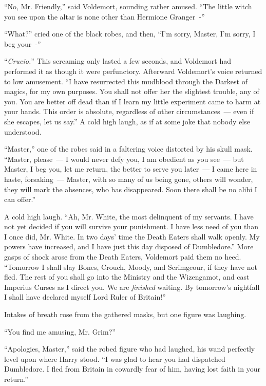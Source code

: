``No, Mr. Friendly,'' said Voldemort, sounding rather amused. ``The little witch you see upon the altar is none other than Hermione Granger~-''

``What?'' cried one of the black robes, and then, ``I'm sorry, Master, I'm sorry, I beg your~-''

``\emph{Crucio.}'' This screaming only lasted a few seconds, and Voldemort had performed it as though it were perfunctory. Afterward Voldemort's voice returned to low amusement. ``I have resurrected this mudblood through the Darkest of magics, for my own purposes. You shall not offer her the slightest trouble, any of you. You are better off dead than if I learn my little experiment came to harm at your hands. This order is absolute, regardless of other circumstances~--- even if she escapes, let us say.'' A cold high laugh, as if at some joke that nobody else understood.

``Master,'' one of the robes said in a faltering voice distorted by his skull mask. ``Master, please~--- I would never defy you, I am obedient as you see~--- but Master, I beg you, let me return, the better to serve you later~--- I came here in haste, forsaking~--- Master, with so many of us being gone, others will wonder, they will mark the absences, who has disappeared. Soon there shall be no alibi I can offer.''

A cold high laugh. ``Ah, Mr. White, the most delinquent of my servants. I have not yet decided if you will survive your punishment. I have less need of you than I once did, Mr. White. In two days' time the Death Eaters shall walk openly. My powers have increased, and I have just this day disposed of Dumbledore.'' More gasps of shock arose from the Death Eaters, Voldemort paid them no heed. ``Tomorrow I shall slay Bones, Crouch, Moody, and Scrimgeour, if they have not fled. The rest of you shall go into the Ministry and the Wizengamot, and cast Imperius Curses as I direct you. We are \emph{finished} waiting. By tomorrow's nightfall I shall have declared myself Lord Ruler of Britain!''

Intakes of breath rose from the gathered masks, but one figure was laughing.

``You find me amusing, Mr. Grim?''

``Apologies, Master,'' said the robed figure who had laughed, his wand perfectly level upon where Harry stood. ``I was glad to hear you had dispatched Dumbledore. I fled from Britain in cowardly fear of him, having lost faith in your return.''

